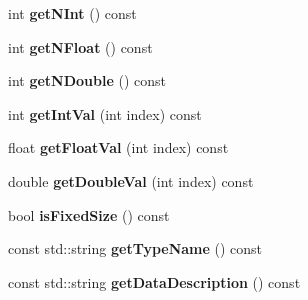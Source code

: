 \begin{DoxyCompactItemize}
\item 
int {\bfseries getNInt} () const \label{classhistmgr_1_1Histogram2D_a89e0f3cdde009efa4214734afb619960}

\item 
int {\bfseries getNFloat} () const \label{classhistmgr_1_1Histogram2D_acfe071923f9d990ec61568fd8c6e72f5}

\item 
int {\bfseries getNDouble} () const \label{classhistmgr_1_1Histogram2D_aa3292dae2356c865b67dc62fdd1abfb5}

\item 
int {\bfseries getIntVal} (int index) const \label{classhistmgr_1_1Histogram2D_a39f56d711ed8d5921f7662d038ead2d1}

\item 
float {\bfseries getFloatVal} (int index) const \label{classhistmgr_1_1Histogram2D_ab2fb60d75ad648ef7cdc259553a5c578}

\item 
double {\bfseries getDoubleVal} (int index) const \label{classhistmgr_1_1Histogram2D_a0ad3f76facb8a045e4ce6a0ac730e72a}

\item 
bool {\bfseries isFixedSize} () const \label{classhistmgr_1_1Histogram2D_a9062278e2daa5a095356fbf331b3b921}

\item 
const std::string {\bfseries getTypeName} () const \label{classhistmgr_1_1Histogram2D_aae1137af1c5d111b441b80d74ef606ba}

\item 
const std::string {\bfseries getDataDescription} () const \label{classhistmgr_1_1Histogram2D_aa9b8b32e5080f678d0b7e876c54ba453}

\end{DoxyCompactItemize}

